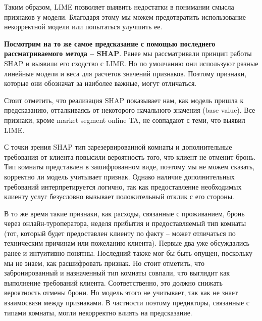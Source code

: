 Таким образом, LIME позволяет выявить недостатки в понимании смысла признаков у модели. Благодаря этому мы можем предотвратить использование некорректной модели или попытаться улучшить ее.

\textbf{Посмотрим на то же самое предсказание с помощью последнего рассматриваемого метода -- SHAP}. Ранее мы рассматривали принцип работы SHAP и выявили его сходство с LIME. Но по умолчанию они используют разные линейные модели и веса для расчетов значений признаков. Поэтому признаки, которые они обозначат за наиболее важные, могут отличаться.

\vspace{-1mm}
\begin{figure}[h]
\end{figure}
\vspace{-7mm}

Стоит отметить, что реализация SHAP показывает нам, как модель пришла к предсказанию, отталкиваясь от некоторого начального значения (base value). Все признаки, кроме market segment online TA, не совпадают с теми, что выявил LIME.

С точки зрения SHAP тип зарезервированной комнаты и дополнительные требования от клиента повысили вероятность того, что клиент не отменит бронь. Тип комнаты представлен в зашифрованном виде, поэтому мы не можем сказать, корректно ли модель учитывает признак. Однако наличие дополнительных требований интерпретируется логично, так как предоставление необходимых клиенту услуг безусловно вызывает положительный отклик с его стороны.

В то же время такие признаки, как расходы, связанные с проживанием, бронь через онлайн-туроператора, неделя прибытия и предоставляемый тип комнаты (тот, который будет предоставлен клиенту по факту -- может отличаться по техническим причинам или пожеланию клиента). Первые два уже обсуждались ранее и интуитивно понятны. Последний также мог бы быть опущен, поскольку мы не знаем, как расшифровать признак. Но стоит отметить, что забронированный и назначенный тип комнаты совпали, что выглядит как выполнение требований клиента. Соответственно, это должно снижать вероятность отмены брони. Но модель этого не учитывает, так как не знает взаимосвязи между признаками. В частности поэтому предикторы, связанные с типами комнаты, могли некорректно влиять на предсказание.

